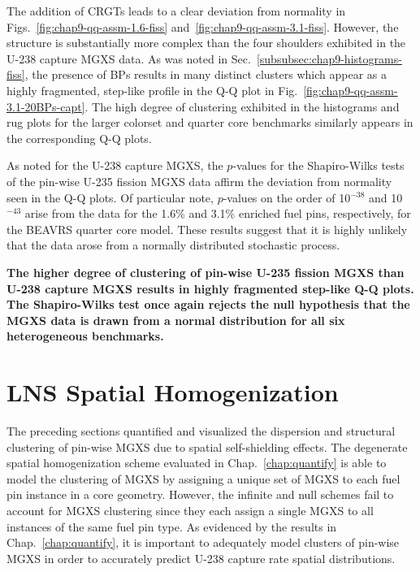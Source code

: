 The addition of \acp{CRGT} leads to a clear deviation from normality in Figs.~\ref{fig:chap9-qq-assm-1.6-fiss} and~\ref{fig:chap9-qq-assm-3.1-fiss}. However, the structure is substantially more complex than the four shoulders exhibited in the U-238 capture \ac{MGXS} data. As was noted in Sec.~\ref{subsubsec:chap9-histograms-fiss}, the presence of \acp{BP} results in many distinct clusters which appear as a highly fragmented, step-like profile in the \ac{Q-Q} plot in Fig.~\ref{fig:chap9-qq-assm-3.1-20BPs-capt}. The high degree of clustering exhibited in the histograms and rug plots for the larger colorset and quarter core benchmarks similarly appears in the corresponding \ac{Q-Q} plots.

As noted for the U-238 capture \ac{MGXS}, the $p$-values for the Shapiro-Wilks tests of the pin-wise U-235 fission \ac{MGXS} data affirm the deviation from normality seen in the \ac{Q-Q} plots. Of particular note, $p$-values on the order of 10$^{-38}$ and 10$^{-43}$ arise from the data for the 1.6\% and 3.1\% enriched fuel pins, respectively, for the \ac{BEAVRS} quarter core model. These results suggest that it is highly unlikely that the data arose from a normally distributed stochastic process.


\begin{emphbox}
\textbf{The higher degree of clustering of pin-wise U-235 fission \ac{MGXS} than U-238 capture \ac{MGXS} results in highly fragmented step-like \ac{Q-Q} plots. The Shapiro-Wilks test once again rejects the null hypothesis that the \ac{MGXS} data is drawn from a normal distribution for all six heterogeneous benchmarks.}
\end{emphbox}


\section{LNS Spatial Homogenization}
\label{sec:chap9-lns-homogenize}

The preceding sections quantified and visualized the dispersion and structural clustering of pin-wise \ac{MGXS} due to spatial self-shielding effects. The degenerate spatial homogenization scheme evaluated in Chap.~\ref{chap:quantify} is able to model the clustering of \ac{MGXS} by assigning a unique set of \ac{MGXS} to each fuel pin instance in a core geometry. However, the infinite and null schemes fail to account for \ac{MGXS} clustering since they each assign a single \ac{MGXS} to all instances of the same fuel pin type. As evidenced by the results in Chap.~\ref{chap:quantify}, it is important to adequately model clusters of pin-wise \ac{MGXS} in order to accurately predict U-238 capture rate spatial distributions. 

